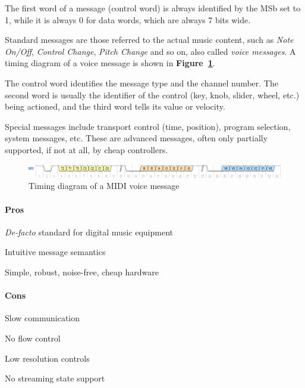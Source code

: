 \documentclass[a4paper,10pt]{article}
\newcommand{\citef}[1]{\textbf{Figure~\ref{#1}}}
\begin{document}
\begin{multicols}{2}
The first word of a message (control word) is always identified by the MSb
set to 1, while it is always 0 for data words, which are always 7 bits wide.

Standard messages are those referred to the actual music content, such as
\emph{Note On/Off}, \emph{Control Change}, \emph{Pitch Change} and so on,
also called \emph{voice messages}. A timing diagram of a voice message is
shown in \citef{fig:midi_voice_msg}.

The control word identifies the message type and the channel number. The
second word is usually the identifier of the control (key, knob, slider,
wheel, etc.) being actioned, and the third word tells its value or velocity.

Special messages include transport control (time, position), program selection,
system messages, etc. These are advanced messages, often only partially
supported, if not at all, by cheap controllers.

\begin{figure}[t]
	\centering
	\includegraphics[keepaspectratio=true,width=\textwidth]{images/midi_voice_msg.pdf}
	\caption{Timing diagram of a MIDI voice message}
	\label{fig:midi_voice_msg}
\end{figure}


\paragraph{Pros}
\begin{itemize*}
	\item \emph{De-facto} standard for digital music equipment
	\item Intuitive message semantics
	\item Simple, robust, noise-free, cheap hardware
\end{itemize*}


\paragraph{Cons}
\begin{itemize*}
	\item Slow communication
	\item No flow control
	\item Low resolution controls
	\item No streaming state support
\end{itemize*}



\end{multicols}
\end{document}
